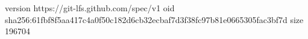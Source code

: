 version https://git-lfs.github.com/spec/v1
oid sha256:61fbf8f5aa417c4a0f50c182d6cb32ecbaf7d3f38fc97b81e0665305fac3bf7d
size 196704
